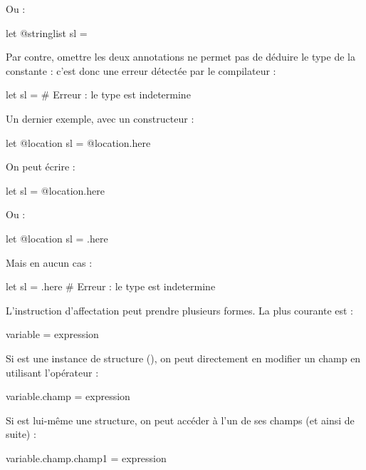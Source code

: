 Ou :
\begin{galgascode}
let @stringlist sl = {}
\end{galgascode}

Par contre, omettre les deux annotations ne permet pas de déduire le type de la constante : c'est donc une erreur détectée par le compilateur :
\begin{galgascode}
let sl = {} # Erreur : le type est indetermine
\end{galgascode}

Un dernier exemple, avec un constructeur :
\begin{galgascode}
let @location sl = @location.here
\end{galgascode}

On peut écrire :
\begin{galgascode}
let sl = @location.here
\end{galgascode}

Ou :
\begin{galgascode}
let @location sl = .here
\end{galgascode}

Mais en aucun cas :
\begin{galgascode}
let sl = .here # Erreur : le type est indetermine
\end{galgascode}




















L'instruction d'affectation peut prendre plusieurs formes. La plus courante est :
\begin{galgascode}
variable = expression
\end{galgascode}

Si  est une instance de structure (), on peut directement en modifier un champ en utilisant l'opérateur  :
\begin{galgascode}
variable.champ = expression
\end{galgascode}

Si  est lui-même une structure, on peut accéder à l'un de ses champs (et ainsi de suite) :
\begin{galgascode}
variable.champ.champ1 = expression
\end{galgascode}













